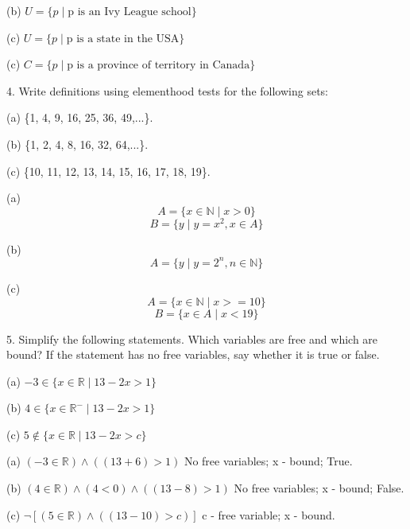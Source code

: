 \documentclass{article}
\begin{document}
(b) $U = \{ p \mid \text{p is an Ivy League school} \}$
\vspace{10pt}

(c) $U = \{ p \mid \text{p is a state in the USA} \}$
\vspace{10pt}

(c) $C = \{ p \mid \text{p is a province of territory in Canada} \}$
\vspace{30pt}

4. Write definitions using elementhood tests for the following sets:

\hspace{12pt}(a) \{1, 4, 9, 16, 25, 36, 49,...\}.

\hspace{12pt}(b) \{1, 2, 4, 8, 16, 32, 64,...\}.

\hspace{12pt}(c) \{10, 11, 12, 13, 14, 15, 16, 17, 18, 19\}.
\vspace{20pt}

(a) $$A = \{ x \in \mathbb{N} \mid x > 0 \}$$
$$B = \{ y \mid y = x^2, x \in A \}$$
\vspace{10pt}

(b) $$A = \{ y \mid y = 2^n, n \in \mathbb{N}\}$$
\vspace{10pt}

(c) $$A = \{x \in \mathbb{N} \mid x >= 10 \}$$
$$B = \{x \in A \mid x < 19 \}$$
\vspace{30pt}

5. Simplify the following statements. Which variables are free and which are
bound? If the statement has no free variables, say whether it is true or
false.

\hspace{12pt}(a) $-3 \in \{x \in \mathbb{R} \mid 13 - 2x > 1 \}$

\hspace{12pt}(b) $4 \in \{x \in \mathbb{R}^- \mid 13 - 2x > 1 \}$

\hspace{12pt}(c) $5 \notin \{x \in \mathbb{R} \mid 13 - 2x > c\}$
\vspace{20pt}

(a) $(-3 \in \mathbb{R}) \land ((13+6) > 1)$ No free variables; x - bound; True.
\vspace{10pt}

(b) $(4 \in \mathbb{R}) \land (4 < 0) \land ((13 - 8) > 1)$ No free variables; x - bound; False.
\vspace{10pt}

(c) $\neg [(5 \in \mathbb{R}) \land ((13 - 10) > c)]$ c - free variable; x - bound.
\vspace{30pt}
\end{document}
